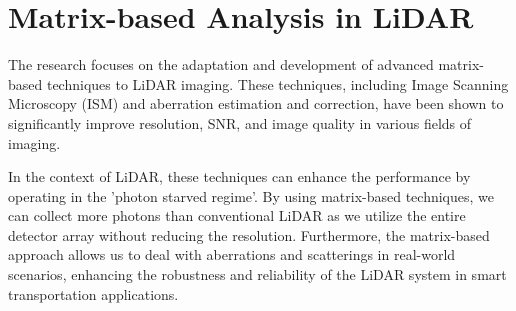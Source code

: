 \documentclass{article}
\begin{document}
\section{Matrix-based Analysis in LiDAR}
The research focuses on the adaptation and development of advanced matrix-based techniques to LiDAR imaging. These techniques, including Image Scanning Microscopy (ISM) and aberration estimation and correction, have been shown to significantly improve resolution, SNR, and image quality in various fields of imaging. 

In the context of LiDAR, these techniques can enhance the performance by operating in the 'photon starved regime'. By using matrix-based techniques, we can collect more photons than conventional LiDAR as we utilize the entire detector array without reducing the resolution. Furthermore, the matrix-based approach allows us to deal with aberrations and scatterings in real-world scenarios, enhancing the robustness and reliability of the LiDAR system in smart transportation applications.
\end{document}

